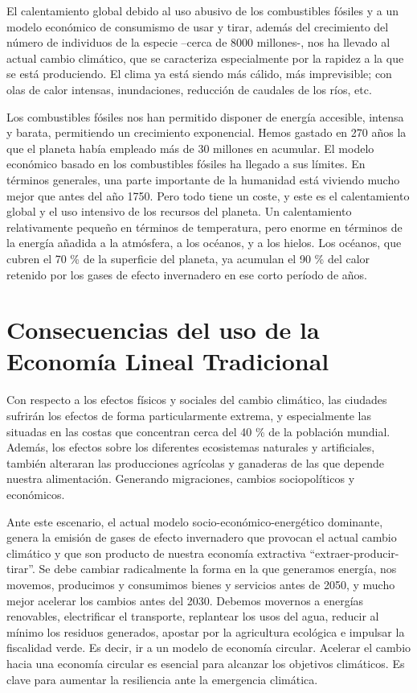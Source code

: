 \documentclass[runningheads]{llncs}
\begin{document}
El calentamiento global debido al uso abusivo de los combustibles fósiles y a un modelo económico de consumismo de usar y tirar, además del crecimiento del número de individuos de la especie –cerca de 8000 millones-, nos ha llevado al actual cambio climático, que se caracteriza especialmente por la rapidez a la que se está produciendo. El clima ya está siendo más cálido, más imprevisible; con olas de calor intensas, inundaciones, reducción de caudales de los ríos, etc. 

Los combustibles fósiles nos han permitido disponer de energía accesible, intensa y barata, permitiendo un crecimiento exponencial. Hemos gastado en 270 años la que el planeta había empleado más de 30 millones en acumular. El modelo económico basado en los combustibles fósiles ha llegado a sus límites. En términos generales, una parte importante de la humanidad está viviendo mucho mejor que antes del año 1750. Pero todo tiene un coste, y este es el calentamiento global y el uso intensivo de los recursos del planeta. Un calentamiento relativamente pequeño en términos de temperatura, pero enorme en términos de la energía añadida a la atmósfera, a los océanos, y a los hielos. Los océanos, que cubren el 70 \% de la superficie del planeta, ya acumulan el 90 \% del calor retenido por los gases de efecto invernadero en ese corto período de años.
\section{Consecuencias del uso de la Economía Lineal Tradicional}

\hspace{0.5cm} Con respecto a los efectos físicos y sociales del cambio climático, las ciudades sufrirán los efectos de forma particularmente extrema, y especialmente las situadas en las costas que concentran cerca del 40 \% de la población mundial. Además, los efectos sobre los diferentes ecosistemas naturales y artificiales, también alteraran las producciones agrícolas y ganaderas de las que depende nuestra alimentación. Generando migraciones, cambios sociopolíticos y económicos.

Ante este escenario, el actual modelo socio-económico-energético dominante, genera la emisión de gases de efecto invernadero que provocan el actual cambio climático y que son producto de nuestra economía extractiva “extraer-producir-tirar”. Se debe cambiar radicalmente la forma en la que generamos energía, nos movemos, producimos y consumimos bienes y servicios  antes de 2050, y mucho mejor acelerar los cambios antes del 2030. Debemos movernos a energías renovables, electrificar el transporte, replantear los usos del agua, reducir al mínimo los residuos generados, apostar por la agricultura ecológica e impulsar la fiscalidad verde. Es decir, ir a un modelo de economía circular. Acelerar el cambio hacia una economía circular es esencial para alcanzar los objetivos climáticos. Es clave para aumentar la resiliencia ante la emergencia climática.
\end{document}
